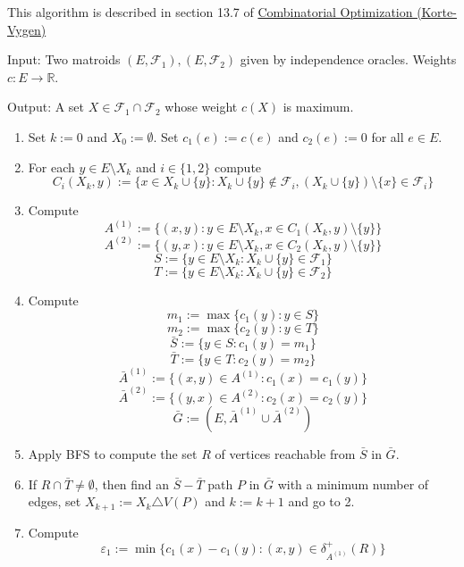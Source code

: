 \documentclass[english,12pt]{article}
\begin{document}
    This algorithm is described in section 13.7 of \href{https://www.mathematik.uni-muenchen.de/~kpanagio/KombOpt/book.pdf}{Combinatorial Optimization (Korte-Vygen)}

    Input: Two matroids $(E, \mathcal{F}_1), (E, \mathcal{F}_2)$ given by independence oracles.
    Weights $c : E \to \mathbb{R}$.

    Output: A set $X \in \mathcal{F}_1 \cap \mathcal{F}_2$ whose weight $c(X)$ is maximum.

    \begin{enumerate}
        \item {
            Set $k := 0$ and $X_0 := \emptyset$.
            Set $c_1(e) := c(e)$ and $c_2(e) := 0$ for all $e \in E$.
        }
        \item {
            For each $y \in E \setminus X_k$ and $i \in \{1, 2\}$ compute
            $$ C_i(X_k, y) := \{x \in X_k \cup \{y\} : X_k \cup \{y\} \not\in \mathcal{F}_i, (X_k \cup \{y\}) \setminus \{x\} \in \mathcal{F}_i\}$$
        }
        \item {
            Compute
            $$ A^{(1)} := \{(x, y) : y \in E \setminus X_k, x \in C_1(X_k, y) \setminus \{y\}\} $$
            $$ A^{(2)} := \{(y, x) : y \in E \setminus X_k, x \in C_2(X_k, y) \setminus \{y\}\} $$
            $$ S := \{y \in E \setminus X_k : X_k \cup \{y\} \in \mathcal{F}_1\} $$
            $$ T := \{y \in E \setminus X_k : X_k \cup \{y\} \in \mathcal{F}_2\} $$
        }
        \item {
            Compute
            $$ m_1 := \max\{c_1(y) : y \in S\} $$
            $$ m_2 := \max\{c_2(y) : y \in T\} $$
            $$ \bar{S} := \{y \in S : c_1(y) = m_1 \} $$
            $$ \bar{T} := \{y \in T : c_2(y) = m_2 \} $$
            $$ \bar{A}^{(1)} := \{(x, y) \in A^{(1)} : c_1(x) = c_1(y) \} $$
            $$ \bar{A}^{(2)} := \{(y, x) \in A^{(2)} : c_2(x) = c_2(y) \} $$
            $$ \bar{G} := (E, \bar{A}^{(1)} \cup \bar{A}^{(2)}) $$
        }
        \item {
            Apply BFS to compute the set $R$ of vertices reachable from $\bar{S}$ in $\bar{G}$.
        }
        \item {
            If $R \cap \bar{T} \neq \emptyset$, then find an $\bar{S} - \bar{T}$ path $P$ in $\bar{G}$ with a minimum number of edges, set $X_{k + 1} := X_k \triangle V(P)$ and $k := k + 1$ and go to 2.
        }
        \item {
            Compute
            $$ \varepsilon_1 := \min \{c_1(x) - c_1(y) : (x, y) \in \delta_{A^{(1)}}^+(R)\} $$
}
\end{enumerate}
\end{document}
